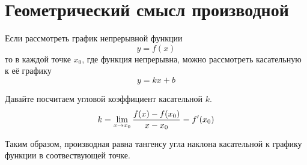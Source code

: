 \section{Геометрический смысл производной}

Если рассмотреть график непрерывной функции 
$$y = f(x)$$
то в каждой точке $x_0$, где функция непрерывна, можно рассмотреть касательную к её графику
$$y = kx + b$$

\begin{center}
\def\svgwidth{6.0cm}

\end{center}

Давайте посчитаем угловой коэффициент касательной $k$.
$$k = \lim_{x\rightarrow x_0} \frac{f(x) - f(x_0)}{x - x_0} = f'(x_0)$$

Таким образом, производная равна тангенсу угла наклона касательной к графику функции в соотвествующей точке.